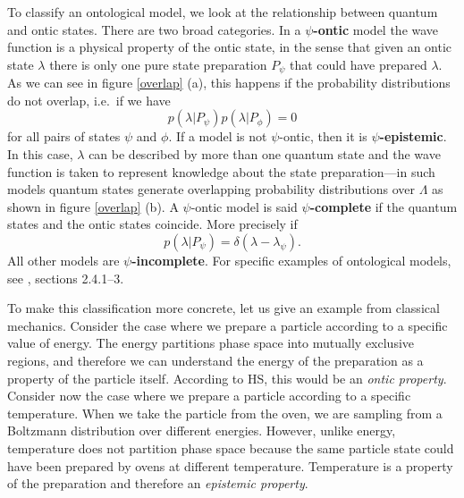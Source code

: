\documentclass[10pt,twocolumn, nofootinbib]{revtex4-2}
\begin{document}
To classify an ontological model, we look at the relationship between quantum and ontic states. There are two broad categories. In a \textbf{$\psi$-ontic} model the wave function is a physical property of the ontic state, in the sense that given an ontic state $\lambda$ there is only one pure state preparation $P_\psi$ that could have prepared $\lambda$. As we can see in figure \ref{overlap} (a), this happens if the probability distributions do not overlap, i.e.\ if we have
\begin{equation}\label{ontic_condition}
	p(\lambda | P_{\psi})p(\lambda|P_{\phi})=0
\end{equation}
for all pairs of states $\psi$ and $\phi$. If a model is not $\psi$-ontic, then it is \textbf{$\psi$-epistemic}. In this case, $\lambda$ can be described by more than one quantum state and the wave function is taken to represent knowledge about the state preparation---in such models quantum states generate overlapping probability distributions over $\Lambda$ as shown in figure \ref{overlap} (b). A $\psi$-ontic model is said \textbf{$\psi$-complete} if the quantum states and the ontic states coincide. More precisely if 
\begin{equation}\label{complete_condition}
	p(\lambda|P_\psi)=\delta(\lambda-\lambda_{\psi}).
\end{equation}
All other models are \textbf{$\psi$-incomplete}. For specific examples of ontological models, see \cite{Harrigan:2010}, sections 2.4.1--3.

To make this classification more concrete, let us give an example from classical mechanics. Consider the case where we prepare a particle according to a specific value of energy. The energy partitions phase space into mutually exclusive regions, and therefore we can understand the energy of the preparation as a property of the particle itself. According to HS, this would be an \emph{ontic property}. Consider now the case where we prepare a particle according to a specific temperature. When we take the particle from the oven, we are sampling from a Boltzmann distribution over different energies. However, unlike energy, temperature does not partition phase space because the same particle state could have been prepared by ovens at different temperature. Temperature is a property of the preparation and therefore an \emph{epistemic property}. 
\end{document}
